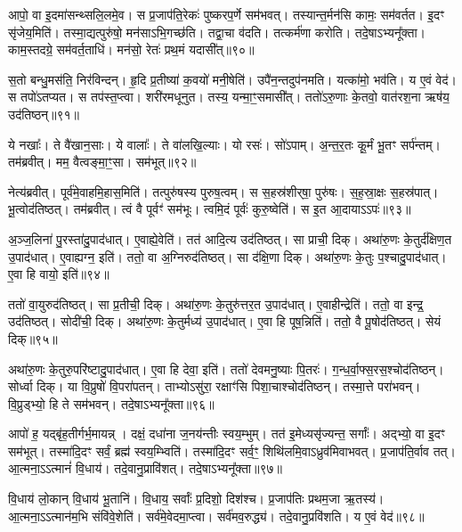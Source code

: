 आपो॒ वा इ॒दमा॑सन्थ्सलि॒लमे॒व। स प्र॒जाप॑ति॒रेकः॑ पुष्करप॒र्णे सम॑भवत्। 
तस्यान्त॒र्मन॑सि कामः॒ सम॑वर्तत। इ॒दꣳ सृ॑जेय॒मिति॑। 
तस्मा॒द्यत्पुरु॑षो॒ मन॑साऽभि॒गच्छ॑ति। तद्वा॒चा व॑दति। 
तत्कर्म॑णा करोति। तदे॒षाऽभ्यनू᳚क्ता। 
काम॒स्तदग्रे॒ सम॑वर्त॒ताधि॑। मन॑सो॒ रेतः॑ प्रथ॒मं यदासी᳚त्॥९०॥


स॒तो बन्धु॒मस॑ति॒ निर॑विन्दन्। हृ॒दि प्र॒तीष्या॑ क॒वयो॑ मनी॒षेति॑। 
उपै॑न॒न्तदुप॑नमति। यत्का॑मो॒ भव॑ति। य ए॒वं वेद॑। 
स तपो॑ऽतप्यत। स तप॑स्त॒प्त्वा। शरी॑रमधूनुत। तस्य॒ यन्मा॒ꣳ॒समासी᳚त्। 
ततो॑ऽरु॒णाः के॒तवो॒ वात॑रश॒ना ऋष॑य॒ उद॑तिष्ठन्॥९१॥


ये नखाः᳚। ते वै॑खान॒साः। ये वालाः᳚। ते वा॑लखि॒ल्याः। 
यो रसः॑। सो॑ऽपाम्। अ॒न्त॒र॒तः कू॒र्मं भू॒तꣳ सर्प॑न्तम्। 
तम॑ब्रवीत्। मम॒ वैत्वङ्मा॒ꣳ॒सा। सम॑भूत्॥९२॥


नेत्य॑ब्रवीत्। पूर्व॑मे॒वाहमि॒हास॒मिति॑। 
तत्पुरु॑षस्य पुरुष॒त्वम्। स स॒हस्र॑शीर्‌षा॒ पुरु॑षः। 
स॒ह॒स्रा॒क्षः स॒हस्र॑पात्। भू॒त्वोद॑तिष्ठत्। 
तम॑ब्रवीत्। त्वं वै पूर्वꣳ॑ सम॑भूः। 
त्वमि॒दं पूर्वः॑ कुरु॒ष्वेति॑। स इ॒त आ॒दायाऽऽपः॑॥९३॥


अ॒ञ्ज॒लिना॑ पु॒रस्ता॑दु॒पाद॑धात्। ए॒वाह्ये॒वेति॑। 
तत॑ आदि॒त्य उद॑तिष्ठत्। सा प्राची॒ दिक्। 
अथा॑रु॒णः के॒तुर्द॑क्षिण॒त उ॒पाद॑धात्। 
ए॒वाह्यग्न॒ इति॑। ततो॒ वा अ॒ग्निरुद॑तिष्ठत्। 
सा द॑क्षि॒णा दिक्। अथा॑रु॒णः के॒तुः प॒श्चादु॒पाद॑धात्। 
ए॒वा हि वायो॒ इति॑॥९४॥


ततो॑ वा॒युरुद॑तिष्ठत्। सा प्र॒तीची॒ दिक्। 
अथा॑रु॒णः के॒तुरु॑त्तर॒त उ॒पाद॑धात्। ए॒वाहीन्द्रेति॑। 
ततो॒ वा इन्द्र॒ उद॑तिष्ठत्। सोदी॑ची॒ दिक्। 
अथा॑रु॒णः के॒तुर्मध्य॑ उ॒पाद॑धात्। ए॒वा हि पूष॒न्निति॑। 
ततो॒ वै पू॒षोद॑तिष्ठत्। सेयं दिक्॥९५॥


अथा॑रु॒णः के॒तुरु॒परि॑ष्टादु॒पाद॑धात्। ए॒वा हि देवा॒ इति॑। 
ततो॑ देवमनु॒ष्याः पि॒तरः॑। ग॒न्ध॒र्वा॒फ्स॒रस॒श्चोद॑तिष्ठन्। 
सोर्ध्वा दिक्। या वि॒प्रुषो॑ वि॒परा॑पतन्। 
ताभ्योऽसु॑रा॒ रक्षाꣳ॑सि पिशा॒चाश्चोद॑तिष्ठन्। तस्मा॒त्ते परा॑भवन्। 
वि॒प्रुड्भ्यो॒ हि ते सम॑भवन्। तदे॒षाऽभ्यनू᳚क्ता॥९६॥


आपो॑ ह॒ यद्बृ॑ह॒तीर्गर्भ॒मायन्न्। दक्षं॒ दधा॑ना ज॒नय॑न्तीः स्वय॒म्भुम्। 
तत॑ इ॒मेध्यसृ॑ज्यन्त॒ सर्गाः᳚। अद्भ्यो॒ वा इ॒दꣳ सम॑भूत्। 
तस्मा॑दि॒दꣳ सर्वं॒ ब्रह्म॑ स्वय॒म्भ्विति॑। 
तस्मा॑दि॒दꣳ सर्व॒ꣳ॒ शिथि॑लमि॒वाऽध्रुव॑मिवाभवत्। 
प्र॒जाप॑ति॒र्वाव तत्। आ॒त्मना॒ऽऽत्मानं॑ वि॒धाय॑। 
तदे॒वानु॒प्रावि॑शत्। तदे॒षाऽभ्यनू᳚क्ता॥९७॥


वि॒धाय॑ लो॒कान्‌ वि॒धाय॑ भू॒तानि॑। वि॒धाय॒ सर्वाः᳚ प्र॒दिशो॒ दिश॑श्च। 
प्र॒जाप॑तिः प्रथम॒जा ऋ॒तस्य॑। आ॒त्मना॒ऽऽत्मान॑म॒भि संवि॑वे॒शेति॑। 
सर्व॑मे॒वेदमा॒प्त्वा। सर्व॑मव॒रुद्ध्य॑। 
तदे॒वानु॒प्रवि॑शति। य ए॒वं वेद॑॥९८॥\anuvakamend


